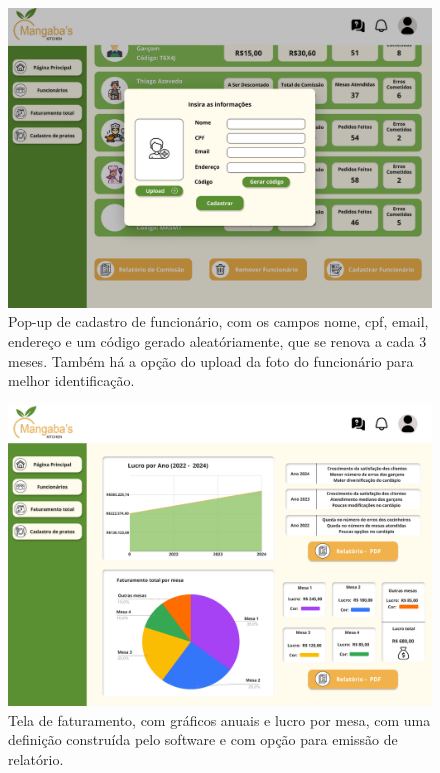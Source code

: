 \begin{center}
\begin{figure}[!htp]
        \includegraphics[width=1\textwidth]{imagens-template/Layout_Gerente_2655.png} 
        \caption{Pop-up de cadastro de funcionário, com os campos nome, cpf, email, endereço e um código gerado aleatóriamente, que se renova a cada 3 meses. Também há a opção do upload da foto do funcionário para melhor identificação.}
    \end{figure}
    \newpage
    \begin{figure}[!htp]
        \includegraphics[width=1\textwidth]{imagens-template/Layout_Gerente_2653.png} 
        \caption{Tela de faturamento, com gráficos anuais e lucro por mesa, com uma definição construída pelo software e com opção para emissão de relatório.}
    \end{figure}
    \newpage
    \begin{figure}[!htp]

\end{figure}
\end{center}
